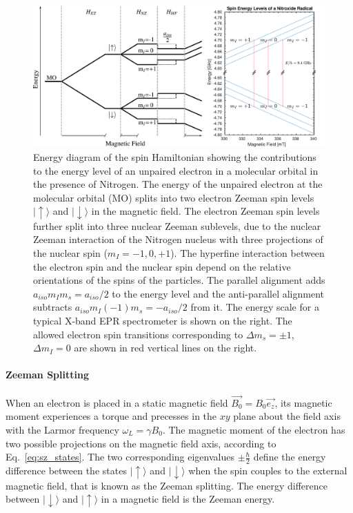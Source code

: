 \begin{figure}[h]
\center
	\includegraphics[width=1.0\textwidth]{./operando_epr/figures/energy_diagram.pdf}
	\caption{Energy diagram of the spin Hamiltonian showing the contributions to the energy level of an unpaired electron in a molecular orbital in the presence of Nitrogen. The energy of the unpaired electron at the molecular orbital (MO) splits into two electron Zeeman spin levels $\vert{\uparrow\rangle}$ and $\vert{\downarrow\rangle}$ in the magnetic field. The electron Zeeman spin levels further split into three nuclear Zeeman sublevels, due to the nuclear Zeeman interaction of the Nitrogen nucleus with three projections of the nuclear spin ($m_I=-1,0,+1$). The hyperfine interaction between the electron spin and the nuclear spin depend on the relative orientations of the spins of the particles. The parallel alignment adds $a_{iso}m_Im_s = a_{iso}/2$ to the energy level and the anti-parallel alignment subtracts $a_{iso}m_I(-1)m_s = -a_{iso}/2$ from it. The energy scale for a typical X-band EPR spectrometer is shown on the right. The allowed electron spin transitions corresponding to $\Delta m_s=\pm 1$, $\Delta m_I=0$ are shown in red vertical lines on the right.}
	\label{fig:energy_diagram}
\end{figure}


\paragraph*{Zeeman Splitting}

When an electron is placed in a static magnetic field $\vec{B_0}=B_0 \vec{e_z}$, its magnetic moment experiences a torque and precesses in the $xy$ plane about the field axis with the Larmor frequency $\omega_L = \gamma B_0$. The magnetic moment of the electron has two possible projections on the magnetic field axis, according to Eq.~\ref{eq:sz_states}. The two corresponding eigenvalues $\pm\frac{\hbar}{2}$ define the energy difference between the states $\vert{\uparrow\rangle}$ and $\vert{\downarrow\rangle}$ when the spin couples to the external magnetic field, that is known as the Zeeman splitting. The energy difference between $\vert{\downarrow}\rangle$ and $\vert{\uparrow}\rangle$ in a magnetic field is the Zeeman energy. 

